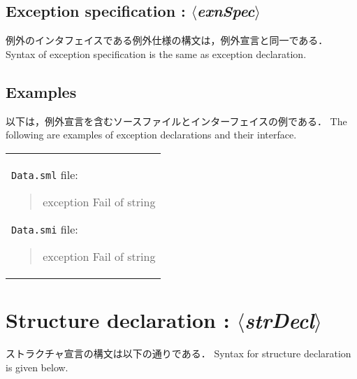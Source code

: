 \documentclass{jbook}
\newcommand{\txt}[2]{#2}
\newcommand{\code}[1]{\mbox{\large\tt #1}}
\newcommand{\nonterm}[1]{\mbox{$\langle$}{\it #1}\mbox{$\rangle$}}
\newenvironment{program}{\begin{quote}\begin{tt}}%
                        {\end{tt}\end{quote}}
\begin{document}
\subsection{\txt{例外仕様}{Exception specification} : \nonterm{exnSpec}}
\ifjp%
	例外のインタフェイスである例外仕様の構文は，例外宣言と同一である．
\else%
	Syntax of exception specification is the same as exception declaration.
\fi%

\subsection{\txt{例外宣言とインタフェイスの例}{Examples}}
\ifjp%
	以下は，例外宣言を含むソースファイルとインターフェイスの例である．
\else%
	The following are examples of exception declarations and their interface.
\fi%

\begin{center}
\begin{tabular}{l}
\begin{minipage}{0.9\textwidth}
\code{Data.sml} file:
\begin{program}
  exception Fail of string
\end{program}
\code{Data.smi} file:
\begin{program}
  exception Fail of string
\end{program}
\end{minipage}
\end{tabular}
\end{center}

\section{\txt{ストラクチャ宣言}{Structure declaration} : \nonterm{strDecl}}
\ifjp%
	ストラクチャ宣言の構文は以下の通りである．
\else%
	Syntax for structure declaration is given below.
\fi%
\end{document}
